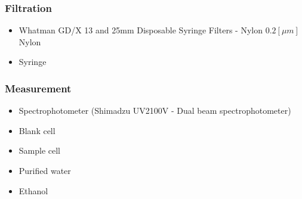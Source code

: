 \begin{appendices}
\subsubsection*{Filtration}
\begin{itemize}
  \item Whatman GD/X 13 and 25mm Disposable Syringe Filters - Nylon $0.2[\mu m]$ Nylon
  \item {\color{red}Syringe}
\end{itemize}
\subsubsection*{Measurement}
\begin{itemize}
  \item Spectrophotometer (Shimadzu UV2100V - Dual beam spectrophotometer)
  \item Blank cell
  \item Sample cell
  \item Purified water
  \item Ethanol
\end{itemize}

\end{appendices}
